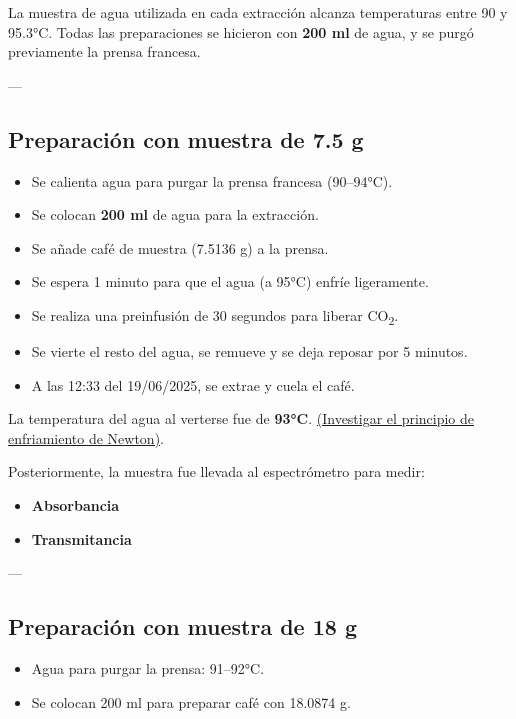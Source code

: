 \documentclass{article}
\begin{document}
La muestra de agua utilizada en cada extracción alcanza temperaturas entre 90 y 95.3°C. Todas las preparaciones se hicieron con \textbf{200 ml} de agua, y se purgó previamente la prensa francesa.

---

\subsection{Preparación con muestra de 7.5 g}

\begin{itemize}
	\item Se calienta agua para purgar la prensa francesa (90–94°C).
	\item Se colocan \textbf{200 ml} de agua para la extracción.
	\item Se añade café de muestra (7.5136 g) a la prensa.
	\item Se espera 1 minuto para que el agua (a 95°C) enfríe ligeramente.
	\item Se realiza una preinfusión de 30 segundos para liberar CO\textsubscript{2}.
	\item Se vierte el resto del agua, se remueve y se deja reposar por 5 minutos.
	\item A las 12:33 del 19/06/2025, se extrae y cuela el café.
\end{itemize}

La temperatura del agua al verterse fue de \textbf{93°C}. \underline{(Investigar el principio de enfriamiento de Newton)}.

Posteriormente, la muestra fue llevada al espectrómetro para medir:
\begin{itemize}
	\item \textcolor{Cinnabar}{\textbf{Absorbancia}}
	\item \textcolor{Apple Green}{\textbf{Transmitancia}}
\end{itemize}

---

\subsection{Preparación con muestra de 18 g}

\begin{itemize}
	\item Agua para purgar la prensa: 91–92°C.
	\item Se colocan 200 ml para preparar café con 18.0874 g.
\end{itemize}
\end{document}
